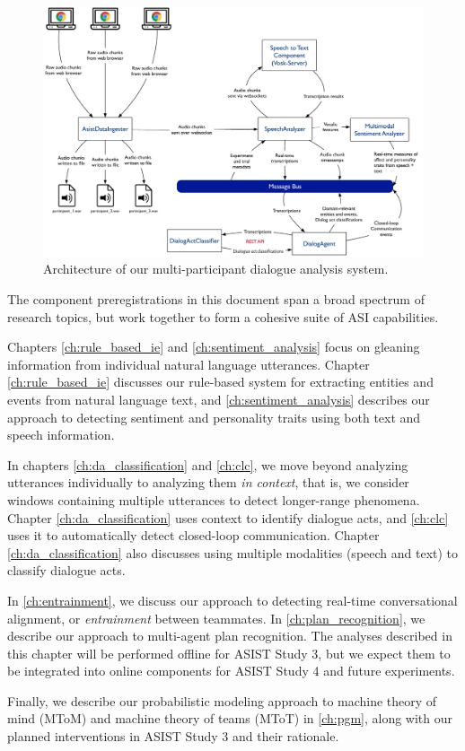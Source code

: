 \begin{figure}
    \centering
    \includegraphics[width=6.5in]{images/nlp_architecture}
    \caption{Architecture of our multi-participant dialogue analysis system.}
    \label{fig:nlp-architecture}
\end{figure}


The component preregistrations in this document span a broad spectrum of
research topics, but work together to form a cohesive suite of ASI
capabilities.

Chapters \ref{ch:rule_based_ie} and \ref{ch:sentiment_analysis} focus on
gleaning information from individual natural language utterances. Chapter
\ref{ch:rule_based_ie} discusses our rule-based system for extracting entities
and events from natural language text, and \autoref{ch:sentiment_analysis}
describes our approach to detecting sentiment and personality traits using both
text and speech information.

In chapters \ref{ch:da_classification} and \ref{ch:clc}, we move
beyond analyzing utterances individually to analyzing them \emph{in context},
that is, we consider windows containing multiple utterances to detect
longer-range phenomena. Chapter \ref{ch:da_classification} uses context to identify
dialogue acts, and \autoref{ch:clc} uses it to automatically detect
closed-loop communication. Chapter \ref{ch:da_classification} also discusses
using multiple modalities (speech and text) to classify dialogue acts.

In \autoref{ch:entrainment}, we discuss our approach to detecting real-time
conversational alignment, or \emph{entrainment} between teammates. In
\autoref{ch:plan_recognition}, we describe our approach to multi-agent plan
recognition. The analyses described in this chapter will be performed offline
for ASIST Study 3, but we expect them to be integrated into online components
for ASIST Study 4 and future experiments.

Finally, we describe our probabilistic modeling approach to machine theory of
mind (MToM) and machine theory of teams (MToT) in \autoref{ch:pgm}, along with
our planned interventions in ASIST Study 3 and their rationale.

